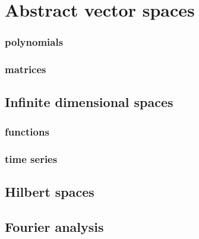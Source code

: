 
\chapter{Abstract vector spaces}
\label{ch:avs}

\subsection{polynomials}
\subsection{matrices}

\section{Infinite dimensional spaces}
\label{sec:inf}

\subsection{functions}
\subsection{time series}

\section{Hilbert spaces}
\label{sec:vect}

\section{Fourier analysis}
\label{sec:trans}
